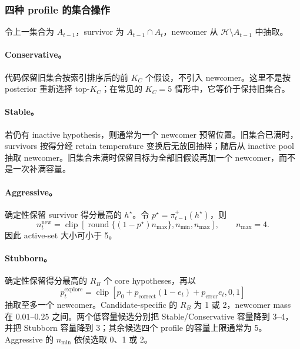 \subsubsection{四种 profile 的集合操作}

令上一集合为 $A_{t-1}$，survivor 为 $A_{t-1}\cap A_t$，newcomer 从 $\mathcal H\setminus A_{t-1}$ 中抽取。

\paragraph{Conservative。}
代码保留旧集合按索引排序后的前 $K_C$ 个假设，不引入 newcomer。这里不是按 posterior 重新选择 top-$K_C$；在常见的 $K_C=5$ 情形中，它等价于保持旧集合。

\paragraph{Stable。}
若仍有 inactive hypothesis，则通常为一个 newcomer 预留位置。旧集合已满时，survivors 按得分经 retain temperature 变换后无放回抽样；随后从 inactive pool 抽取 newcomer。旧集合未满时保留目标为全部旧假设再加一个 newcomer，而不是一次补满容量。

\paragraph{Aggressive。}
确定性保留 survivor 得分最高的 $h^\star$。令 $p^\star=\pi_{t-1}^{+}(h^\star)$，则
\begin{equation}
    n_t^{\mathrm{new}}
    =\operatorname{clip}\!\left[
      \operatorname{round}\{(1-p^\star)n_{\max}\},
      n_{\min},n_{\max}
    \right],
    \qquad n_{\max}=4.
    \label{eq:modelv13-aggressive-count}
\end{equation}
因此 active-set 大小可小于 5。

\paragraph{Stubborn。}
确定性保留得分最高的 $R_B$ 个 core hypotheses，再以
\begin{equation}
    p_t^{\mathrm{explore}}
    =\operatorname{clip}\!\left[
    p_0+p_{\mathrm{correct}}(1-e_t)+p_{\mathrm{error}}e_t,0,1
    \right]
    \label{eq:modelv13-stubborn-explore}
\end{equation}
抽取至多一个 newcomer。Candidate-specific 的 $R_B$ 为 1 或 2，newcomer mass 在 $0.01$--$0.25$ 之间。两个低容量候选分别把 Stable/Conservative 容量降到 3--4，并把 Stubborn 容量降到 3；其余候选四个 profile 的容量上限通常为 5。Aggressive 的 $n_{\min}$ 依候选取 0、1 或 2。


